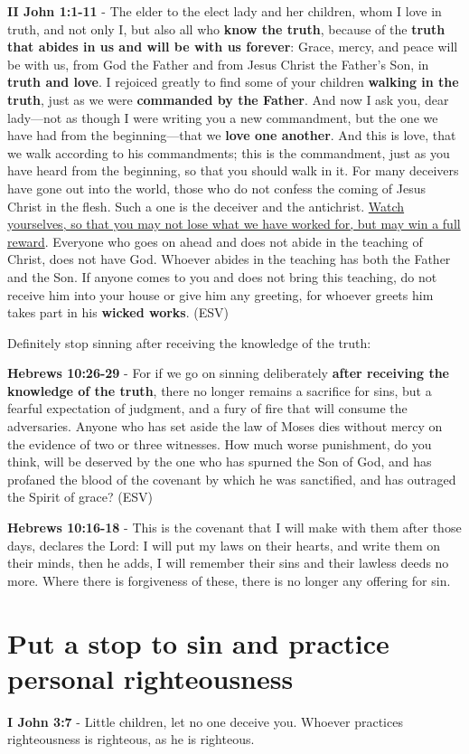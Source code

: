 \documentclass[11pt]{article}
\begin{document}
\textbf{II John 1:1-11} - The elder to the elect lady and her children, whom I love in truth, and not only I, but also all who \textbf{know the truth}, because of the \textbf{truth that abides in us and will be with us forever}: Grace, mercy, and peace will be with us, from God the Father and from Jesus Christ the Father's Son, in \textbf{truth and love}.  I rejoiced greatly to find some of your children \textbf{walking in the truth}, just as we were \textbf{commanded by the Father}.  And now I ask you, dear lady—not as though I were writing you a new commandment, but the one we have had from the beginning—that we \textbf{love one another}.  And this is love, that we walk according to his commandments; this is the commandment, just as you have heard from the beginning, so that you should walk in it.  For many deceivers have gone out into the world, those who do not confess the coming of Jesus Christ in the flesh. Such a one is the deceiver and the antichrist.  \uline{Watch yourselves, so that you may not lose what we have worked for, but may win a full reward}.  Everyone who goes on ahead and does not abide in the teaching of Christ, does not have God. Whoever abides in the teaching has both the Father and the Son.  If anyone comes to you and does not bring this teaching, do not receive him into your house or give him any greeting, for whoever greets him takes part in his \textbf{wicked works}. (ESV)

Definitely stop sinning after receiving the knowledge of the truth:

\textbf{Hebrews 10:26-29} - For if we go on sinning deliberately \textbf{after receiving the knowledge of the truth}, there no longer remains a sacrifice for sins, but a fearful expectation of judgment, and a fury of fire that will consume the adversaries. Anyone who has set aside the law of Moses dies without mercy on the evidence of two or three witnesses. How much worse punishment, do you think, will be deserved by the one who has spurned the Son of God, and has profaned the blood of the covenant by which he was sanctified, and has outraged the Spirit of grace? (ESV)

\textbf{Hebrews 10:16-18} - This is the covenant that I will make with them after those days, declares the Lord: I will put my laws on their hearts, and write them on their minds, then he adds, I will remember their sins and their lawless deeds no more. Where there is forgiveness of these, there is no longer any offering for sin.

\section{Put a stop to sin and practice personal righteousness}
\label{sec:org90c7126}
\textbf{I John 3:7} - Little children, let no one deceive you. Whoever practices righteousness is righteous, as he is righteous.
\end{document}
